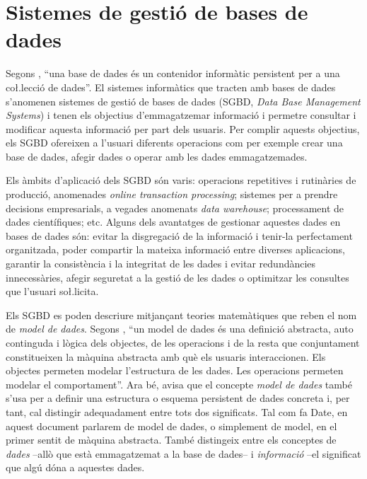 \section{Sistemes de gestió de bases de dades}
\label{sec:art:sgbd}



Segons \textcite{date:introduction}, ``una base de dades és un
contenidor informàtic persistent per a una co\l.lecció de dades''. El
sistemes informàtics que tracten amb bases de dades s'anomenen
sistemes de gestió de bases de dades (SGBD, \emph{Data Base Management
  Systems}) i tenen els objectius d'emmagatzemar informació i permetre
consultar i modificar aquesta informació per part dels usuaris.  Per
complir aquests objectius, els SGBD ofereixen a l'usuari diferents
operacions com per exemple crear una base de dades, afegir dades o
operar amb les dades emmagatzemades. 

Els àmbits d'aplicació dels SGBD són varis: operacions repetitives i
rutinàries de producció, anomenades \emph{online transaction
  processing}; sistemes per a prendre decisions empresarials, a
vegades anomenats \emph{data warehouse}; processament de dades
científiques; etc.  Alguns dels avantatges de gestionar aquestes dades
en bases de dades són: evitar la disgregació de la informació i
tenir-la perfectament organitzada, poder compartir la mateixa
informació entre diverses aplicacions, garantir la consistència i la
integritat de les dades i evitar redundàncies innecessàries, afegir
seguretat a la gestió de les dades o optimitzar les consultes que
l'usuari so\l.licita.


Els SGBD es poden descriure mitjançant teories matemàtiques que reben
el nom de \emph{model de dades}.  Segons
\citeauthor{date:introduction}, ``un model de dades és una definició
abstracta, auto continguda i lògica dels objectes, de les operacions i
de la resta que conjuntament constitueixen la màquina abstracta amb
què els usuaris interaccionen. Els objectes permeten modelar
l'estructura de les dades. Les operacions permeten modelar el
comportament''. Ara bé, \citeauthor{date:introduction} avisa que el
concepte \emph{model de dades} també s'usa per a definir una
estructura o esquema persistent de dades concreta i, per tant, cal distingir
adequadament entre tots dos significats.  Tal com fa Date, en aquest
document parlarem de model de dades, o simplement de model, en el
primer sentit de màquina abstracta. També distingeix entre els
conceptes de \emph{dades} --allò que està emmagatzemat a la base de
dades-- i \emph{informació} --el significat que algú dóna a aquestes
dades.


